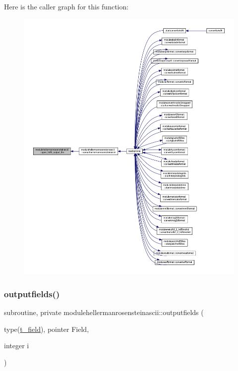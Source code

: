 Here is the caller graph for this function\+:\nopagebreak
\begin{figure}[H]
\begin{center}
\leavevmode
\includegraphics[width=350pt]{namespacemodulehellermanrosensteinascii_a7fa8f1b341c583ddb13cecd1d05b9e77_icgraph}
\end{center}
\end{figure}
\mbox{\label{namespacemodulehellermanrosensteinascii_ab76e43d5b0134daf9106f606a088cbea}} 
\subsubsection{\texorpdfstring{outputfields()}{outputfields()}}
{\footnotesize\ttfamily subroutine, private modulehellermanrosensteinascii\+::outputfields (\begin{DoxyParamCaption}\item[{type(\mbox{\hyperlink{structmodulehellermanrosensteinascii_1_1t__field}{t\+\_\+field}}), pointer}]{Field,  }\item[{integer}]{i }\end{DoxyParamCaption})\hspace{0.3cm}{\ttfamily [private]}}

